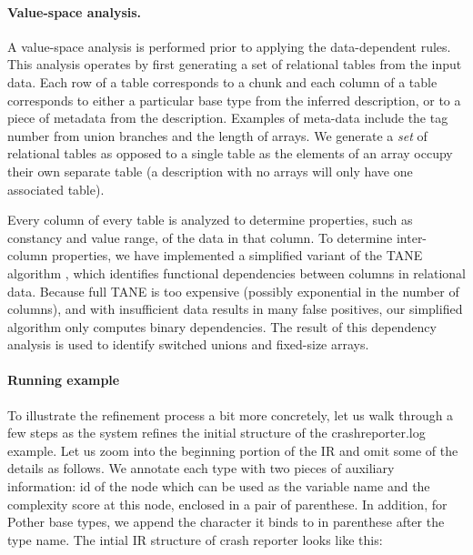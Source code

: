 \paragraph*{Value-space analysis.}
A value-space analysis is performed prior
to applying the data-dependent rules.
This analysis operates by first generating a set of relational tables
from the input data.
Each row of a table corresponds to a chunk and each column of a table
corresponds to either a particular base type from the inferred description,
or to a piece of metadata from the description.  Examples of meta-data
include the tag number from union branches and the length of arrays.
We generate a {\em set} of relational tables as opposed to a single table
as the elements of an array occupy their own separate table (a description 
with no arrays will only have one associated table).
 
Every column of every table is analyzed to determine properties,
such as constancy and value range, of the data in that column.
To determine inter-column properties, we have implemented a simplified
variant of the TANE algorithm \cite{TANE-HKPT99},
which identifies functional dependencies between columns in 
relational data.  Because full TANE is too expensive 
(possibly exponential in the number of columns), 
and with insufficient data results in many false positives, 
our simplified algorithm only computes binary dependencies. The 
result of this dependency analysis is used to 
identify switched unions and fixed-size arrays.

\paragraph*{Running example}
To illustrate the refinement process a bit more concretely, let us walk through
a few steps as the system refines the initial structure of the crashreporter.log example.
Let us zoom into the beginning portion of the IR and omit some of the details as follows. 
We annotate each type with two pieces of auxiliary information: id of the node which
can be used as the variable name and the complexity score at this node, 
enclosed in a pair of parenthese. In addition, for Pother base types,
we append the character it binds to in parenthese after the type name.
The intial IR structure of crash reporter looks like this:

